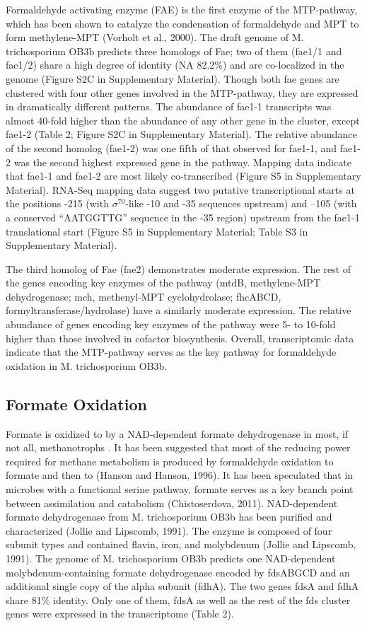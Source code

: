 Formaldehyde activating enzyme (FAE) is the first enzyme of the MTP-pathway, which has been shown to catalyze the condensation of formaldehyde and MPT to form methylene-MPT (Vorholt et al., 2000).
The draft genome of M. trichosporium OB3b predicts three homologs of Fae; two of them (fae1/1 and fae1/2) share a high degree of identity (NA 82.2\%) and are co-localized in the genome (Figure S2C in Supplementary Material).
Though both fae genes are clustered with four other genes involved in the MTP-pathway, they are expressed in dramatically different patterns.
The abundance of fae1-1 transcripts was almost 40-fold higher than the abundance of any other gene in the cluster, except fae1-2 (Table 2; Figure S2C in Supplementary Material).
The relative abundance of the second homolog (fae1-2) was one fifth of that observed for fae1-1, and fae1-2 was the second highest expressed gene in the pathway.
Mapping data indicate that fae1-1 and fae1-2 are most likely co-transcribed (Figure S5 in Supplementary Material).
RNA-Seq mapping data suggest two putative transcriptional starts at the positions -215 (with $\sigma^{70}$-like -10 and -35 sequences upstream) and –105 (with a conserved “AATGGTTG” sequence in the -35 region) upstream from the fae1-1 translational start (Figure S5 in Supplementary Material; Table S3 in Supplementary Material).

The third homolog of Fae (fae2) demonstrates moderate expression.
The rest of the genes encoding key enzymes of the pathway (mtdB, methylene-MPT dehydrogenase; mch, methenyl-MPT cyclohydrolase; fhcABCD, formyltransferase/hydrolase) have a similarly moderate expression.
The relative abundance of genes encoding key enzymes of the pathway were 5- to 10-fold higher than those involved in cofactor biosynthesis.
Overall, transcriptomic data indicate that the MTP-pathway serves as the key pathway for formaldehyde oxidation in M. trichosporium OB3b.

\subsection{Formate Oxidation}
Formate is oxidized to  by a NAD-dependent formate dehydrogenase in most, if not all, methanotrophs \cite{anthony1982}.
It has been suggested that most of the reducing power required for methane metabolism is produced by formaldehyde oxidation to formate and then to  (Hanson and Hanson, 1996).
It has been speculated that in microbes with a functional serine pathway, formate serves as a key branch point between assimilation and catabolism (Chistoserdova, 2011).
NAD-dependent formate dehydrogenase from M. trichosporium OB3b has been purified and characterized (Jollie and Lipscomb, 1991).
The enzyme is composed of four subunit types and contained flavin, iron, and molybdenum (Jollie and Lipscomb, 1991).
The genome of M. trichosporium OB3b predicts one NAD-dependent molybdenum-containing formate dehydrogenase encoded by fdsABGCD and an additional single copy of the alpha subunit (fdhA).
The two genes fdsA and fdhA share 81\% identity.
Only one of them, fdsA as well as the rest of the fds cluster genes were expressed in the transcriptome (Table 2).


